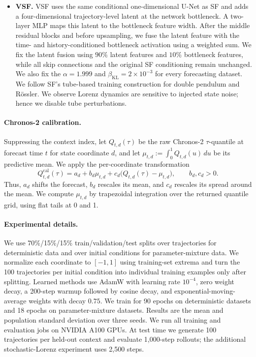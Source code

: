 \begin{itemize}
  \item \textbf{VSF.} VSF uses the same conditional one-dimensional U-Net as
  SF and adds a four-dimensional trajectory-level latent at the network
  bottleneck.  A two-layer MLP maps this latent to the bottleneck feature
  width.  After the middle residual blocks and before upsampling, we fuse the
  latent feature with the time- and history-conditioned bottleneck activation
  using a weighted sum.  We fix the latent
  fusion using $90\%$ latent features and $10\%$ bottleneck features, while all
  skip connections and the original SF conditioning remain unchanged.  We
  also fix the $\alpha=1.999$ and $\beta_{\mathrm{KL}}=2\times10^{-3}$ for every forecasting dataset.
  We follow SF's tube-based training construction for double pendulum and R\"ossler. We observe Lorenz dynamics
  are sensitive to injected state noise; hence we disable tube perturbations.
\end{itemize}

\paragraph{Chronos-2 calibration.}
Suppressing the context index, let $Q_{t,d}(\tau)$ be the raw Chronos-2
$\tau$-quantile at forecast time $t$ for state coordinate $d$, and let
$\mu_{t,d}:=\int_0^1Q_{t,d}(u)\,du$ be its predictive mean.  We apply the
per-coordinate transformation
\begin{equation}
  Q^{\mathrm{cal}}_{t,d}(\tau)
  =a_d+b_d\mu_{t,d}
   +c_d\bigl(Q_{t,d}(\tau)-\mu_{t,d}\bigr),
  \qquad b_d,c_d>0.
  \label{eq:chronos2-affine-calibration}
\end{equation}
Thus, $a_d$ shifts the forecast, $b_d$ rescales its mean, and $c_d$ rescales
its spread around the mean.  We compute $\mu_{t,d}$ by trapezoidal integration
over the returned quantile grid, using flat tails at 0 and 1.

\paragraph{Experimental details.}
We use 70\%/15\%/15\% train/validation/test splits over trajectories for
deterministic data and over initial conditions for parameter-mixture data.
We normalize each coordinate to $[-1,1]$ using training-set extrema and turn
the 100 trajectories per initial condition into individual training examples
only after splitting.  Learned methods
use AdamW with learning rate $10^{-4}$, zero weight decay,
a 200-step warmup followed by cosine decay, and exponential-moving-average
weights with decay $0.75$.  We train for 90 epochs on deterministic datasets
and 18 epochs on parameter-mixture datasets.  Results are the mean and
population standard deviation over three seeds.   We run all training and evaluation jobs on NVIDIA A100 GPUs. At test time we
generate 100 trajectories per held-out context and evaluate 1,000-step
rollouts; the additional stochastic-Lorenz experiment uses 2,500 steps.

